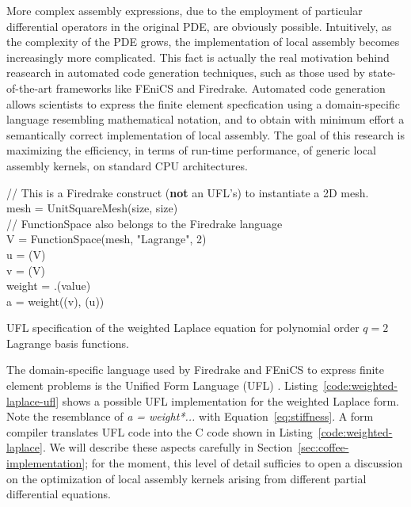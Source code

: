 More complex assembly expressions, due to the employment of particular differential operators in the original PDE, are obviously possible. Intuitively, as the complexity of the PDE grows, the implementation of local assembly becomes increasingly more complicated. This fact is actually the real motivation behind reasearch in automated code generation techniques, such as those used by state-of-the-art frameworks like FEniCS and Firedrake. Automated code generation allows scientists to express the finite element specfication using a domain-specific language resembling mathematical notation, and to obtain with minimum effort a semantically correct implementation of local assembly. The goal of this research is maximizing the efficiency, in terms of run-time performance, of generic local assembly kernels, on standard CPU architectures. 

\begin{algorithm}[t]
\scriptsize
{}

// This is a Firedrake construct (\textbf{not} an UFL's) to instantiate a 2D mesh.\\
mesh = UnitSquareMesh(size, size)\\
// FunctionSpace also belongs to the Firedrake language \\
V = FunctionSpace(mesh, "Lagrange", 2)\\
u = (V)\\
v = (V)\\
weight = .(value)\\
a = weight\KwSty{*}((v), (u))
\caption{UFL specification of the weighted Laplace equation for polynomial order $q=2$ Lagrange basis functions.}
\label{code:weighted-laplace-ufl}
\end{algorithm}

The domain-specific language used by Firedrake and FEniCS to express finite element problems is the Unified Form Language (UFL) \citep{ufl}. Listing~\ref{code:weighted-laplace-ufl} shows a possible UFL implementation for the weighted Laplace form. Note the resemblance of \emph{a = weight*...} with Equation~\ref{eq:stiffness}. A form compiler translates UFL code into the C code shown in Listing~\ref{code:weighted-laplace}. We will describe these aspects carefully in Section~\ref{sec:coffee-implementation}; for the moment, this level of detail sufficies to open a discussion on the optimization of local assembly kernels arising from different partial differential equations.

